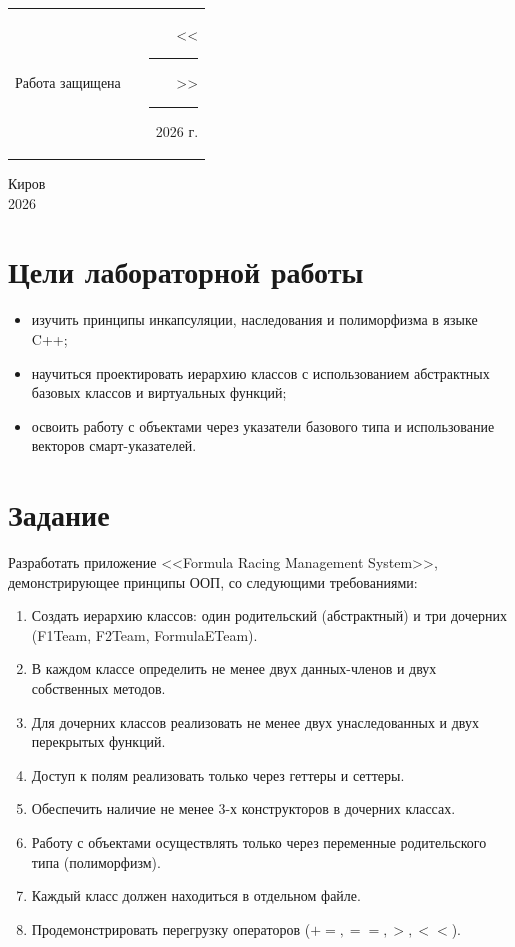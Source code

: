 \documentclass[oneside,a4paper,14pt]{extarticle}
\begin{document}
\noindent
\begin{tabular}{lp{58mm}r}
  Работа защищена &  & \hspace{13mm}<<\rule[-1mm]{5mm}{0.10mm}\/>>\rule[-1mm]{30mm}{0.10mm}\ 2026 г.
\end{tabular}
\vfill

\begin{center}
  Киров\\
  2026
\end{center}

\newpage\thispagestyle{plain}

\section*{Цели лабораторной работы}
\begin{itemize}
  \item[$-$] изучить принципы инкапсуляции, наследования и полиморфизма в языке C++;
  \item[$-$] научиться проектировать иерархию классов с использованием абстрактных базовых классов и виртуальных функций;
  \item[$-$] освоить работу с объектами через указатели базового типа и использование векторов смарт-указателей.
\end{itemize}

\section*{Задание}
Разработать приложение <<Formula Racing Management System>>, демонстрирующее принципы ООП, со следующими требованиями:
\begin{enumerate}
  \item Создать иерархию классов: один родительский (абстрактный) и три дочерних (F1Team, F2Team, FormulaETeam).
  \item В каждом классе определить не менее двух данных-членов и двух собственных методов.
  \item Для дочерних классов реализовать не менее двух унаследованных и двух перекрытых функций.
  \item Доступ к полям реализовать только через геттеры и сеттеры.
  \item Обеспечить наличие не менее 3-х конструкторов в дочерних классах.
  \item Работу с объектами осуществлять только через переменные родительского типа (полиморфизм).
  \item Каждый класс должен находиться в отдельном файле.
  \item Продемонстрировать перегрузку операторов ($+=, ==, >, <<$).
\end{enumerate}
\end{document}
